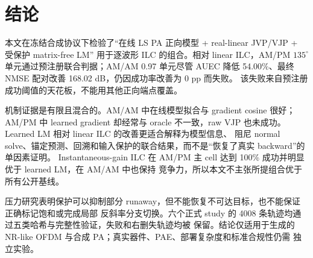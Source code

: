 \documentclass[UTF8,zihao=-4,a4paper]{ctexart}
\begin{document}
\section{结论}

本文在冻结合成协议下检验了“在线 LS PA 正向模型 + real-linear JVP/VJP + 受保护 matrix-free LM”
用于逐波形 ILC 的组合。相对 linear ILC，AM/PM $135^\circ$ 单元通过预注册联合判据；AM/AM 0.97
单元尽管 AUEC 降低 54.00\%、最终 NMSE 配对改善 168.02 dB，仍因成功率改善为 0 pp 而失败。
该失败来自预注册成功阈值的天花板，不能用其他正向端点覆盖。

机制证据是有限且混合的。AM/AM 中在线模型拟合与 gradient cosine 很好；AM/PM 中 learned gradient
却经常与 oracle 不一致，raw VJP 也未成功。Learned LM 相对 linear ILC 的改善更适合解释为模型信息、
阻尼 normal solve、锚定预测、回溯和输入保护的联合结果，而不是“恢复了真实 backward”的单因素证明。
Instantaneous-gain ILC 在 AM/PM 主 cell 达到 100\% 成功并明显优于 learned LM，在 AM/AM 中也保持
竞争力，所以本文不主张所提组合优于所有公开基线。

压力研究表明保护可以抑制部分 runaway，但不能恢复不可达目标，也不能保证正确标记饱和或完成局部
反斜率分支切换。六个正式 study 的 4008 条轨迹均通过五类哈希与完整性验证，失败和右删失轨迹均被
保留。结论仅适用于生成的 NR-like OFDM 与合成 PA；真实器件、PAE、部署复杂度和标准合规性仍需
独立实验。



\end{document}
